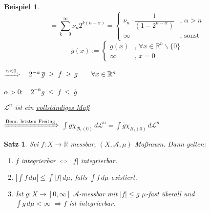 \documentclass[11pt]{memoir}
\theoremstyle{changebreak}
\newtheorem{Beispiel}{Beispiel}[chapter]
\newtheorem{Satz}{Satz}[chapter]
\begin{document}
\begin{Beispiel}
\begin{equation}
= \sum\limits_{k=0}^\infty  \nu_n 2^{k(n-\alpha)} =
\begin{cases}
	\nu_n \cdotp \dfrac{1}{(1-2^{n-\alpha})} & ,\,\alpha > n \\
	\infty & , \text{ sonst}
\end{cases}
\end{equation}
\begin{equation}
\overline{g}(x) :=
\begin{cases}
	g(x) & ,\,\forall x \in \mathbb R^n \backslash \{0\} \\
	\infty & ,\,x = 0
\end{cases}
\end{equation}
\begin{center}
	$\xRightarrow{\alpha < 0} \quad2^{-\alpha}\,\overline{g} \;\geq \;f \;\geq\, g\qquad \forall x \in \mathbb R^n$ 
\end{center}
\begin{center}
	$\alpha > 0: \quad 2^{-\alpha}g \;\leq\; f \;\leq\; \overline g$ 
\end{center}
\par\bigskip
$\mathscr L^n$ ist ein \underline{vollständiges Maß} 
\begin{center}
	$\xRightarrow{\text{Bem. letzten Freitag}}$ $\int g \chi_{\mathscr B_1 (0)} \,d\mathscr L^n = \int \overline g \chi_{B_1(0)}\, d\mathscr L^n$
\end{center}
\end{Beispiel}

\begin{Satz}
Sei $f: X \rightarrow \overline{\mathbb R}$ messbar, $(X, \mathscr A, \mu)$ Maßraum. Dann gelten:
\begin{enumerate}
	\item $f$ integrierbar $\Leftrightarrow$ $|f|$ integrierbar.
	\item $\left| \int f \,d\mu \right| \leq \int |f| \,d\mu$, falls $\int f \,d\mu$ existiert.
	\item Ist $g: X \rightarrow [0, \infty]$ $\mathscr A$-messbar mit $|f| \leq g$ $\mu$-fast überall und \\
	$\int g \, d\mu < \infty$ $\Rightarrow f$ ist integrierbar.
\end{enumerate}
\end{Satz}
\end{document}
